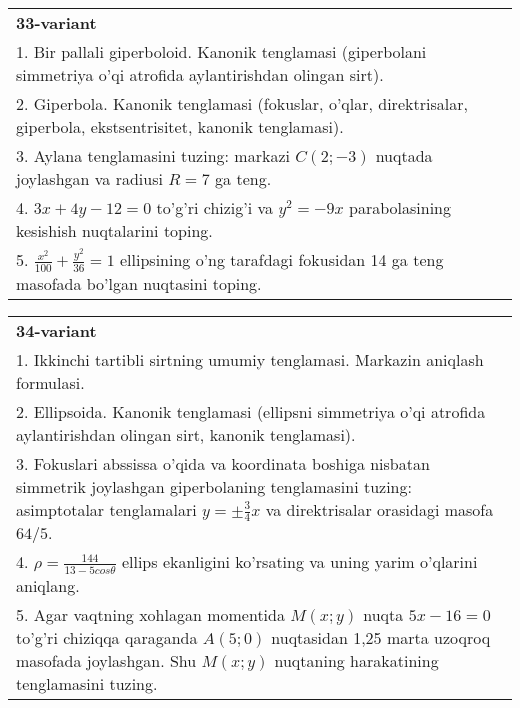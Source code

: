 \documentclass{article}
\begin{document}
\begin{tabular}{m{17cm}}
\textbf{33-variant}\\
1. Bir pallali giperboloid. Kanonik tenglamasi (giperbolani simmetriya o'qi atrofida aylantirishdan olingan sirt).\\

2. Giperbola. Kanonik tenglamasi (fokuslar, o'qlar, direktrisalar, giperbola, ekstsentrisitet, kanonik tenglamasi).\\

3. Aylana tenglamasini tuzing: markazi $C(2;-3)$ nuqtada joylashgan va radiusi $R=7$ ga teng.\\

4. $3x + 4y - 12 = 0$ to'g'ri chizig'i va $y^{2} = - 9x$ parabolasining kesishish nuqtalarini toping.\\

5. $\frac{x^{2}}{100} + \frac{y^{2}}{36} = 1$ ellipsining o'ng tarafdagi fokusidan 14 ga teng masofada bo'lgan nuqtasini toping.  
\end{tabular}
\vspace{1cm}


\begin{tabular}{m{17cm}}
\textbf{34-variant}\\
1. Ikkinchi tartibli sirtning umumiy tenglamasi. Markazin aniqlash formulasi.\\

2. Ellipsoida. Kanonik tenglamasi (ellipsni simmetriya o'qi atrofida aylantirishdan olingan sirt, kanonik tenglamasi).\\

3. Fokuslari abssissa o'qida va koordinata boshiga nisbatan simmetrik joylashgan giperbolaning tenglamasini tuzing: asimptotalar tenglamalari $y=\pm \frac{3}{4}x$ va direktrisalar orasidagi masofa $64/5$.\\

4. $\rho = \frac{144}{13 - 5cos\theta}$ ellips ekanligini ko'rsating va uning yarim o'qlarini aniqlang.\\

5. Agar vaqtning xohlagan momentida $M(x;y)$ nuqta $5x - 16 = 0$ to'g'ri chiziqqa qaraganda $A(5;0)$ nuqtasidan 1,25 marta uzoqroq masofada joylashgan. Shu $M(x;y)$ nuqtaning harakatining tenglamasini tuzing.  
\end{tabular}
\vspace{1cm}
\end{document}
